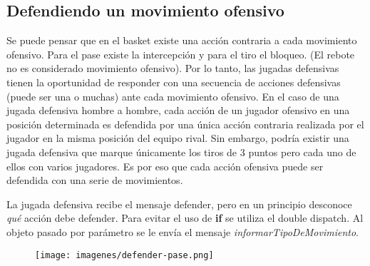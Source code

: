 \subsection{Defendiendo un movimiento ofensivo}

Se puede pensar que en el basket existe una acción contraria a cada movimiento ofensivo. Para el pase existe la intercepción y para el tiro el bloqueo. (El rebote no es considerado
movimiento ofensivo). Por lo tanto, las jugadas defensivas tienen la oportunidad de responder con una secuencia de acciones defensivas (puede ser una o muchas) ante cada movimiento
ofensivo. En el caso de una jugada defensiva hombre a hombre, cada acción de un jugador ofensivo en una posición determinada es defendida por una única acción 
contraria realizada por el jugador en la misma posición del equipo rival. Sin embargo, podría existir una jugada defensiva que marque únicamente los tiros de 3 puntos pero cada uno de ellos
con varios jugadores. Es por eso que cada acción ofensiva puede ser defendida con una serie de movimientos.

La jugada defensiva recibe el mensaje defender, pero en un principio desconoce \emph{qué} acción debe defender. Para evitar el uso de \textbf{if} se utiliza el double dispatch.
Al objeto pasado por parámetro se le envía el mensaje \emph{informarTipoDeMovimiento}.

\newpage
\begin{landscape}

  \begin{figure}[h!]
   \texttt{[image: imagenes/defender-pase.png]}
   \caption{}
  \end{figure}

\end{landscape}
\newpage

